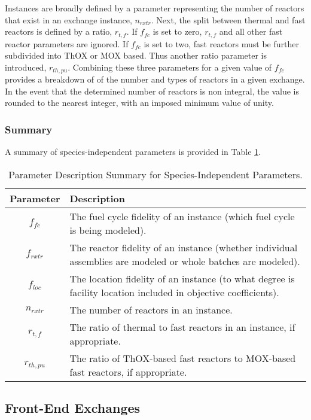 Instances are broadly defined by a parameter representing the number of reactors
that exist in an exchange instance, $n_{rxtr}$. Next, the split between thermal
and fast reactors is defined by a ratio, $r_{t, f}$. If $f_{fc}$ is set to zero,
$r_{t, f}$ and all other fast reactor parameters are ignored. If $f_{fc}$ is set
to two, fast reactors must be further subdivided into ThOX or MOX based. Thus
another ratio parameter is introduced, $r_{th, pu}$. Combining these three
parameters for a given value of $f_{fc}$ provides a breakdown of of the number
and types of reactors in a given exchange. In the event that the determined
number of reactors is non integral, the value is rounded to the nearest integer,
with an imposed minimum value of unity. 

\subsubsection{Summary}

A summary of species-independent parameters is provided in Table
\ref{tbl:global_params}.

\begin{table}[h]
\centering
\caption{Parameter Description Summary for Species-Independent Parameters.}
\label{tbl:global_params}
\begin{tabularx}{\columnwidth-10pt}{|c|X|} %
\hline
Parameter    & 
Description
\\ \hline
$f_{fc}$     & 
The fuel cycle fidelity of an instance (which fuel cycle is being modeled).
\\ \hline
$f_{rxtr}$   & 
The reactor fidelity of an instance (whether individual assemblies are modeled
or whole batches are modeled).  
\\ \hline
$f_{loc}$    & 
The location fidelity of an instance (to what degree is facility location
included in objective coefficients).
\\ \hline
$n_{rxtr}$   & 
The number of reactors in an instance.
\\ \hline
$r_{t, f}$   & 
The ratio of thermal to fast reactors in an instance, if appropriate.
\\ \hline
$r_{th, pu}$ & 
The ratio of ThOX-based fast reactors to MOX-based fast reactors, if appropriate.
\\ \hline
\end{tabularx}
\end{table}

\subsection{Front-End Exchanges}\label{method:setup:front}

